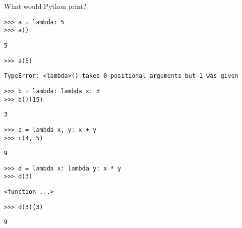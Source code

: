 \question What would Python print?

\begin{lstlisting}
>>> a = lambda: 5
>>> a()
\end{lstlisting}
\begin{solution}[0.2in]
\begin{lstlisting}
5
\end{lstlisting}
\end{solution}

\begin{lstlisting}
>>> a(5)
\end{lstlisting}
\begin{solution}[0.2in]
\begin{lstlisting}
TypeError: <lambda>() takes 0 positional arguments but 1 was given
\end{lstlisting}
\end{solution}

\begin{lstlisting}
>>> b = lambda: lambda x: 3
>>> b()(15)
\end{lstlisting}
\begin{solution}[0.2in]
\begin{lstlisting}
3
\end{lstlisting}
\end{solution}

\begin{lstlisting}
>>> c = lambda x, y: x + y
>>> c(4, 5)
\end{lstlisting}
\begin{solution}[0.2in]
\begin{lstlisting}
9
\end{lstlisting}
\end{solution}

\begin{lstlisting}
>>> d = lambda x: lambda y: x * y
>>> d(3)
\end{lstlisting}
\begin{solution}[0.2in]
\begin{lstlisting}
<function ...>
\end{lstlisting}
\end{solution}

\begin{lstlisting}
>>> d(3)(3)
\end{lstlisting}
\begin{solution}[0.2in]
\begin{lstlisting}
9
\end{lstlisting}
\end{solution}

